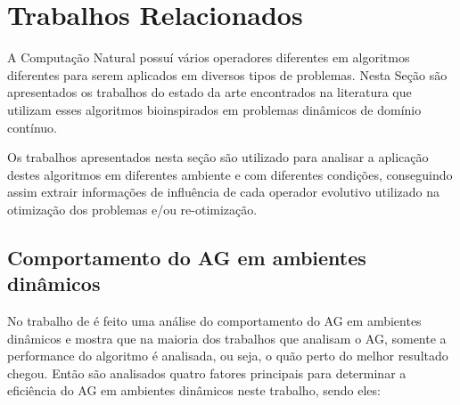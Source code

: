 \chapter{Trabalhos Relacionados}
\label{ch:relacionados}
A Computação Natural possuí vários operadores diferentes em algoritmos diferentes para serem aplicados em diversos tipos de problemas. Nesta Seção são apresentados os trabalhos do estado da arte encontrados na literatura que utilizam esses algoritmos bioinspirados em problemas dinâmicos de domínio contínuo.

Os trabalhos apresentados nesta seção são utilizado para analisar a aplicação destes algoritmos em diferentes ambiente e com diferentes condições, conseguindo assim extrair informações de influência de cada operador evolutivo utilizado na otimização dos problemas e/ou re-otimização.

\section{Comportamento do AG em ambientes dinâmicos}
\label{sec:ag_behaviour}

No trabalho de \cite{rand2005measurements} é feito uma análise do comportamento do AG em ambientes dinâmicos e mostra que na maioria dos trabalhos que analisam o AG, somente a performance do algoritmo é analisada, ou seja, o quão perto do melhor resultado chegou. Então são analisados quatro fatores principais para determinar a eficiência do AG em ambientes dinâmicos neste trabalho, sendo eles:

